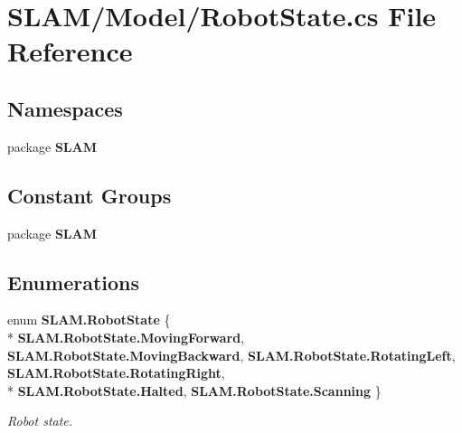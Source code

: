 \section{S\-L\-A\-M/\-Model/\-Robot\-State.cs File Reference}
\label{_robot_state_8cs}
\subsection*{Namespaces}
\begin{DoxyCompactItemize}
\item 
package {\bf S\-L\-A\-M}
\end{DoxyCompactItemize}
\subsection*{Constant Groups}
\begin{DoxyCompactItemize}
\item 
package {\bf S\-L\-A\-M}
\end{DoxyCompactItemize}
\subsection*{Enumerations}
\begin{DoxyCompactItemize}
\item 
enum {\bf S\-L\-A\-M.\-Robot\-State} \{ \\*
{\bf S\-L\-A\-M.\-Robot\-State.\-Moving\-Forward}, 
{\bf S\-L\-A\-M.\-Robot\-State.\-Moving\-Backward}, 
{\bf S\-L\-A\-M.\-Robot\-State.\-Rotating\-Left}, 
{\bf S\-L\-A\-M.\-Robot\-State.\-Rotating\-Right}, 
\\*
{\bf S\-L\-A\-M.\-Robot\-State.\-Halted}, 
{\bf S\-L\-A\-M.\-Robot\-State.\-Scanning}
 \}
\begin{DoxyCompactList}\small\item\em Robot state. \end{DoxyCompactList}\end{DoxyCompactItemize}
